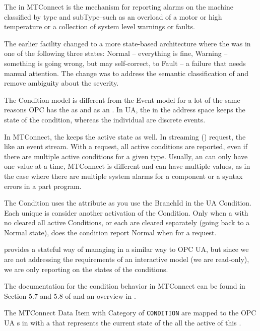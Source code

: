 The    in MTConnect is the mechanism for reporting alarms on the machine classified by type and subType–such as an overload of a motor or high temperature or a collection of system level warnings or faults.

The earlier   facility changed to a more state-based architecture where the  was in one of the following three states: Normal – everything is fine, Warning – something is going wrong, but may self-correct, to Fault – a failure that needs manual attention. The change was to address the semantic classification of  and remove ambiguity about the  severity.

The Condition model is different from the Event model for a lot of the same reasons OPC has the  as  and as an . In UA, the  in the address space keeps the state of the condition, whereas the individual  are discrete events.

In MTConnect, the  keeps the active state as well. In streaming () request, the  like an event stream. With a  request, all active conditions are reported, even if there are multiple active conditions for a given type. Usually, an  can only have one value at a time, MTConnect  is different and can have multiple values, as in the case where there are multiple system alarms for a component or a syntax errors in a part program.

The Condition uses the attribute  as you use the BranchId in the UA Condition. Each unique  is consider another activation of the Condition. Only when a  with no  cleared all active Conditions, or each are cleared separately (going back to a Normal state), does the condition report Normal when for a  request.

 provides a stateful way of managing  in a similar way to OPC UA, but since we are not addressing the requirements of an interactive model (we are read-only), we are only reporting on the states of the conditions. 

The documentation for the condition behavior in MTConnect can be found in Section 5.7 and 5.8 of \cite{MTCPart3} and an overview in \cite{MTCPart2}.

The MTConnect Data Item with Category of \texttt{CONDITION} are mapped to the OPC UA s  in \cite{UAPart9} with a  that represents the current state of the all the active  of this .